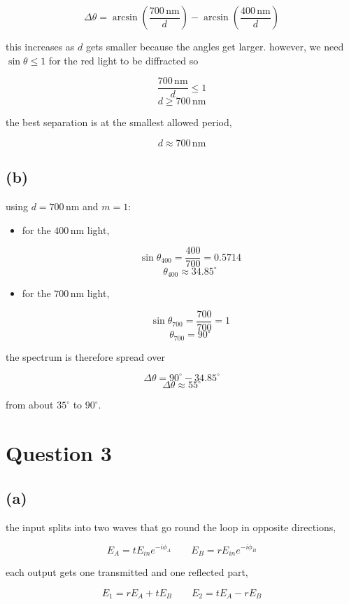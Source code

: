\documentclass{article}
\begin{document}
\[
\Delta\theta
=
\arcsin\left(\frac{700\,\mathrm{nm}}{d}\right)
-
\arcsin\left(\frac{400\,\mathrm{nm}}{d}\right)
\]

this increases as $d$ gets smaller because the angles get larger. however, we need $\sin\theta\leq1$ for the red light to be diffracted so

\[
\frac{700\,\mathrm{nm}}{d}\leq1
\]
\[
d\geq700\,\mathrm{nm}
\]

the best separation is at the smallest allowed period,

\[
\boxed{d\approx700\,\mathrm{nm}}
\]
 
\subsection*{(b)}
 
using $d=700\,\mathrm{nm}$ and $m=1$:

\begin{itemize}
    \item for the $400\,\mathrm{nm}$ light,

\[
\sin\theta_{400}=\frac{400}{700}=0.5714
\]
\[
\theta_{400}\approx34.85^\circ
\]

\item for the $700\,\mathrm{nm}$ light,

\[
\sin\theta_{700}=\frac{700}{700}=1
\]
\[
\theta_{700}=90^\circ
\]
\end{itemize}

the spectrum is therefore spread over

\[
\Delta\theta=90^\circ-34.85^\circ
\]
\[
\boxed{\Delta\theta\approx55^\circ}
\]

from about $35^\circ$ to $90^\circ$.

\section*{Question 3}

\subsection*{(a)}

the input splits into two waves that go round the loop in opposite directions,

\[
E_A=tE_{in}e^{-i\phi_A}
\qquad
E_B=rE_{in}e^{-i\phi_B}
\]

each output gets one transmitted and one reflected part,
 
\[
E_1=rE_A+tE_B
\qquad
E_2=tE_A-rE_B
\]
\end{document}
